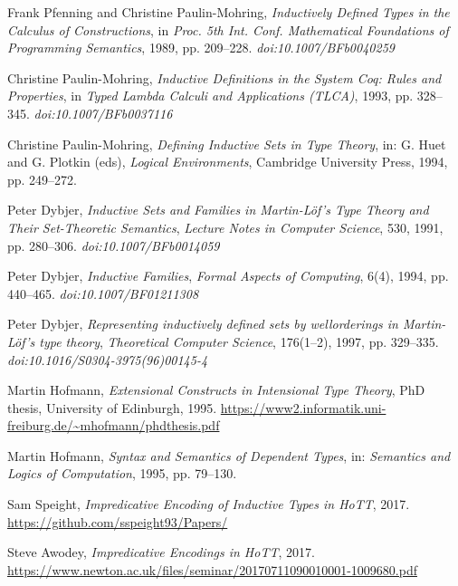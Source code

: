 \documentclass{article}
\theoremstyle{definition}
\begin{document}
\newpage
\begin{thebibliography}{99}


Frank Pfenning and Christine Paulin-Mohring,
\textit{Inductively Defined Types in the Calculus of Constructions},
in \textit{Proc. 5th Int. Conf. Mathematical Foundations of Programming Semantics}, 1989, pp. 209–228.
\textit{doi:10.1007/BFb0040259}

Christine Paulin-Mohring,
\textit{Inductive Definitions in the System Coq: Rules and Properties},
in \textit{Typed Lambda Calculi and Applications (TLCA)}, 1993, pp. 328–345.
\textit{doi:10.1007/BFb0037116}

Christine Paulin-Mohring,
\textit{Defining Inductive Sets in Type Theory},
in: G. Huet and G. Plotkin (eds), \textit{Logical Environments}, Cambridge University Press, 1994, pp. 249–272.

Peter Dybjer,
\textit{Inductive Sets and Families in Martin-Löf's Type Theory and Their Set-Theoretic Semantics},
\textit{Lecture Notes in Computer Science}, 530, 1991, pp. 280–306.
\textit{doi:10.1007/BFb0014059}

Peter Dybjer,
\textit{Inductive Families},
\textit{Formal Aspects of Computing}, 6(4), 1994, pp. 440–465.
\textit{doi:10.1007/BF01211308}

Peter Dybjer,
\textit{Representing inductively defined sets by wellorderings in Martin-Löf’s type theory},
\textit{Theoretical Computer Science}, 176(1–2), 1997, pp. 329–335.
\textit{doi:10.1016/S0304-3975(96)00145-4}

Martin Hofmann,
\textit{Extensional Constructs in Intensional Type Theory},
PhD thesis, University of Edinburgh, 1995.
\url{https://www2.informatik.uni-freiburg.de/~mhofmann/phdthesis.pdf}

Martin Hofmann,
\textit{Syntax and Semantics of Dependent Types},
in: \textit{Semantics and Logics of Computation}, 1995, pp. 79–130.


Sam Speight,
\textit{Impredicative Encoding of Inductive Types in HoTT},
2017.
\url{https://github.com/sspeight93/Papers/}

Steve Awodey,
\textit{Impredicative Encodings in HoTT},
2017.
\url{https://www.newton.ac.uk/files/seminar/20170711090010001-1009680.pdf}


\end{thebibliography}
\end{document}
